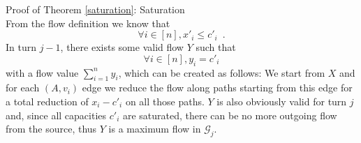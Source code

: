 \begin{sepproof}{Proof of Theorem \ref{saturation}: Saturation} \ \\
  From the flow definition we know that
  \begin{equation}
  \label{saturation:flowleqcap}
    \forall i \in [n], x'_i \leq c'_i \enspace.
  \end{equation}
  In turn $j-1$, there exists some valid flow $Y$ such that
  \begin{equation*}
    \forall i \in [n], y_i = c'_i
  \end{equation*}
  with a flow value $\sum\limits_{i=1}^{n}y_i$, which can be created as follows: We start from $X$ and for each
  $\left(A, v_i\right)$ edge we reduce the flow along paths starting from this edge for a total reduction of $x_i - c'_i$ on
  all those paths. $Y$ is also obviously valid for turn $j$ and, since all capacities $c'_i$ are saturated, there can
  be no more outgoing flow from the source, thus $Y$ is a maximum flow in $\mathcal{G}_j$.
\end{sepproof}
